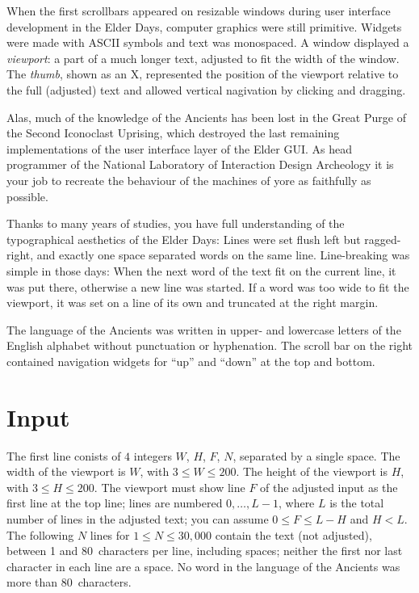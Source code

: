 

When the first scrollbars appeared on resizable windows during user interface development in the Elder Days, computer graphics were still primitive.
Widgets were made with ASCII symbols and text was monospaced.
A window displayed a \emph{viewport}: a part of a much longer text, adjusted to fit the width of the window.
The \emph{thumb}, shown as an X, represented the position of the viewport relative to the full (adjusted) text and allowed vertical nagivation by clicking and dragging.

Alas, much of the knowledge of the Ancients has been lost in the Great Purge of the Second Iconoclast Uprising, which destroyed the last remaining implementations of the user interface layer of the Elder GUI. 
As head programmer of the National Laboratory of Interaction Design Archeology it is your job to recreate the behaviour of the machines of yore as faithfully as possible.

Thanks to many years of studies, you have full understanding of the typographical aesthetics of the Elder Days:
Lines were set flush left but ragged-right, and exactly one space separated words on the same line. 
Line-breaking was simple in those days:
When the next word of the text fit on the current line, it was put there, otherwise a new line was started.
If a word was too wide to fit the viewport, it was set on a line of its own and truncated at the right margin.

The language of the Ancients was written in upper- and lowercase letters of the English alphabet without punctuation or hyphenation.
The scroll bar on the right contained navigation widgets for ``up'' and ``down'' at the top and bottom. 

\section*{Input}

The first line conists of $4$ integers $W$, $H$, $F$, $N$, separated by a single space.
The width of the viewport is $W$, with $3\leq W\leq 200$.
The height of the viewport is $H$, with $3\leq H\leq 200$.
The viewport must show line $F$ of the adjusted input as the first line at the top line; lines are numbered $0,\ldots, L-1$, where $L$ is the total number of lines in the adjusted text; you can assume $0\leq F \leq L - H$ and $H < L$.
The following $N$ lines for $1\leq N\leq 30,000$ contain the text (not adjusted), between 1 and 80~characters per line, including spaces; neither the first nor last character in each line are a space.
No word in the language of the Ancients was more than 80~characters.


